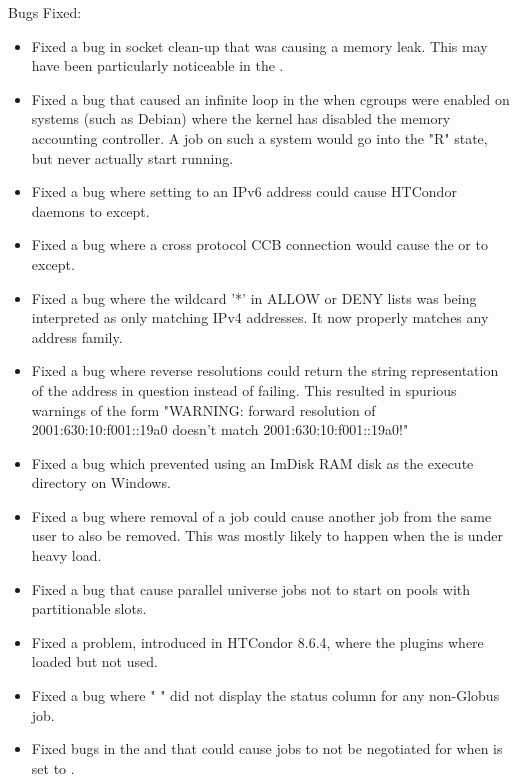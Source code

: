 \noindent Bugs Fixed:

\begin{itemize}

\item Fixed a bug in socket clean-up that was causing a memory leak.  This
may have been particularly noticeable in the .

\item Fixed a bug that caused an infinite loop in the  when
cgroups were enabled on systems (such as Debian) where the kernel has disabled
the memory accounting controller.  A job on such a system would go into the
"R" state, but never actually start running.

\item Fixed a bug where setting  to an
IPv6 address could cause HTCondor daemons to except.

\item Fixed a bug where a cross protocol CCB connection would cause the
 or  to except.

\item Fixed a bug where the wildcard '*' in ALLOW or DENY lists was
being interpreted as only matching IPv4 addresses.  It now properly
matches any address family.

\item Fixed a bug where reverse resolutions could return the string
representation of the address in question instead of failing.  This
resulted in spurious warnings of the form "WARNING: forward resolution of
2001:630:10:f001::19a0 doesn't match 2001:630:10:f001::19a0!"

\item Fixed a bug which prevented using an ImDisk RAM disk
as the execute directory on Windows.

\item Fixed a bug where removal of a job could cause another job from
the same user to also be removed.
This was mostly likely to happen when the  is under
heavy load.

\item Fixed a bug that cause parallel universe jobs not to start on
pools with partitionable slots.

\item Fixed a problem, introduced in HTCondor 8.6.4, where the
 plugins where loaded but not used.

\item Fixed a bug where " " did not display the
status column for any non-Globus job.

\item Fixed bugs in the  and  that
could cause jobs to not be negotiated for when
 is set to .

\end{itemize}

